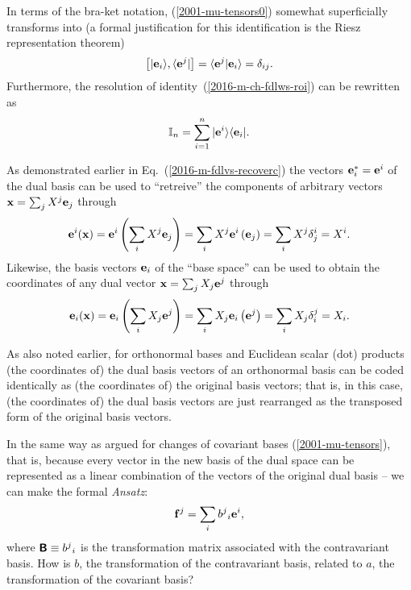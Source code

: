 In terms of the bra-ket notation, (\ref{2001-mu-tensors0}) somewhat superficially transforms into
(a formal justification for this identification is the Riesz representation theorem)
\begin{equation}
\left [ \vert {\bf e}_i \rangle , \langle  {\bf e}^j \vert \right]=
\langle  {\bf e}^j \vert {\bf e}_i \rangle =
  \delta_{ij}
.
\label{2001-mu-tensors0bk}
\end{equation}
Furthermore, the resolution of identity~(\ref{2016-m-ch-fdlws-roi}) can be rewritten as
\begin{equation}
 {\Bbb I}_n = \sum_{i=1}^n \vert {\bf e}^i \rangle \langle {\bf e}_i \vert
.
\label{2016-m-ch-tensor-roi}
\end{equation}

As demonstrated earlier in Eq.~(\ref{2016-m-fdlvs-recoverc}) the vectors ${\bf e}^\ast_i = {\bf e}^i$ of the dual basis can be used to ``retreive'' the components of arbitrary vectors
${\bf x} = \sum_j X^j {\bf e}_j$  through
\begin{equation}
{\bf e}^i ( {\bf x} ) =
{\bf e}^i \left( \sum_i X^j {\bf e}_j \right) =
\sum_i  X^j {\bf e}^i \left({\bf e}_j \right) =
\sum_i  X^j \delta^i_j =
 X^i.
\label{2016-m-tensor-recoverc}
\end{equation}
Likewise, the basis vectors ${\bf e}_i$ of the ``base space'' can be used to obtain the coordinates of any dual vector ${\bf x} = \sum_j X_j {\bf e}^j$  through
\begin{equation}
{\bf e}_i ( {\bf x} ) =
{\bf e}_i \left( \sum_i X_j {\bf e}^j \right) =
\sum_i  X_j {\bf e}_i \left({\bf e}^j \right) =
\sum_i  X_j \delta_i^j =
 X_i.
\label{2016-m-tensor-recoverc2}
\end{equation}


As also noted earlier,  for orthonormal bases and Euclidean scalar (dot) products (the coordinates of) the dual basis vectors of an orthonormal basis can be coded identically
as  (the coordinates of) the original basis vectors; that is,
in this case,
(the coordinates of) the dual basis vectors are just rearranged as the transposed form of the original basis vectors.


In the same way as argued for changes of covariant bases (\ref{2001-mu-tensors}),
that is, because every vector in the new basis of the dual space can be represented as a linear combination of the vectors of the original dual basis -- we can make the formal {\it Ansatz}:
\begin{equation}
{\bf f}^j=\sum_i{b^j}_i{\bf e}^i,
\label{2016-m-ch-tensor-tocontravb}
\end{equation}
where $ \textsf{\textbf{B}} \equiv {b^j}_i$ is
the transformation matrix associated with the contravariant basis.
How is $b$, the transformation of the contravariant basis, related to $a$,
the transformation of the covariant basis?

